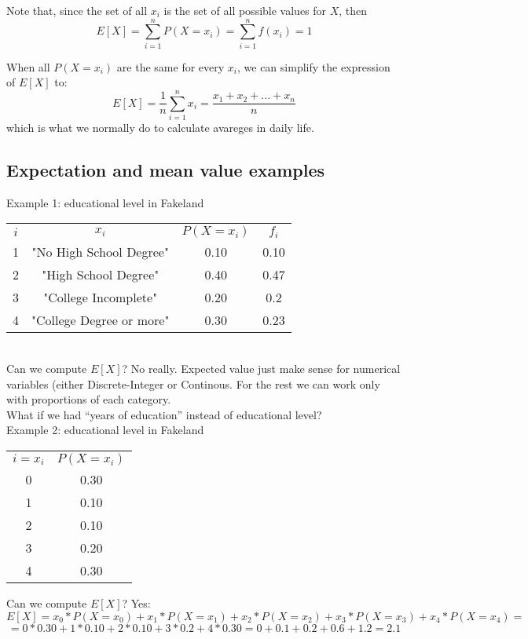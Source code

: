 \documentclass[11pt]{article}
\begin{document}
	Note that, since the set of all $x_i$ is the set of all possible values for $X$, then
	\[E[X] = \sum\limits_{i=1}^n P(X = x_i) = \sum\limits_{i=1}^n f(x_i) = 1\]

	When all $P(X=x_i)$ are the same for every $x_i$, we can simplify the expression of $E[X]$ to:
	\[E[X] = \frac{1}{n}\sum\limits_{i=1}^n x_i = \frac{x_1 + x_2 + ... + x_n}{n}\]
	which is what we normally do to calculate avareges in daily life.

	\subsection*{Expectation and mean value examples}

	Example 1: educational level in Fakeland

\begin{tabular}{|c|c|c|c|}
\hline
	$i$ & $x_i$ & $P(X=x_i)$ & $f_i$\\
	\cline{1-4}
	1 & "No High School Degree" & 0.10 & 0.10\\
	2 & "High School Degree" & 0.40 & 0.47\\
	3 & "College Incomplete" & 0.20 & 0.2\\
	4 & "College Degree or more" & 0.30 & 0.23\\	
\hline
\end{tabular}\newline\\

	Can we compute $E[X]$? No really. Expected value just make sense for numerical variables (either Discrete-Integer or Continous. For the rest we can work only with proportions of each category.\\
	
	What if we had ``years of education'' instead of educational level?\\
	
	Example 2: educational level in Fakeland
	
		\begin{tabular}{|c|c|}
\hline
	$i = x_i$ & $P(X=x_i)$\\
	\cline{1-2}
	0 & 0.30\\
	1 & 0.10\\
	2 & 0.10\\
	3 & 0.20\\
	4 & 0.30\\
\hline
\end{tabular}

Can we compute $E[X]$? Yes:
\[ E[X] = x_0 * P(X = x_0)+ x_1 * P(X = x_1) + x_2 * P(X = x_2) + x_3 * P(X = x_3) + x_4 * P(X = x_4) = \]
\[ = 0 * 0.30 + 1 * 0.10 + 2 * 0.10 + 3 * 0.2 + 4 * 0.30  = 0 + 0.1 + 0.2 + 0.6 + 1.2 = 2.1\]
	
\end{document}
